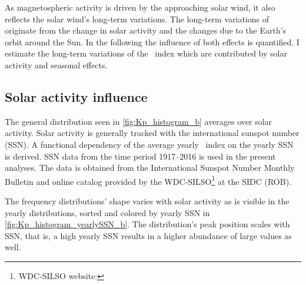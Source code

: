 As magnetospheric activity is driven by the approaching solar wind, it also reflects the solar wind's long-term variations. The long-term variations of \Kp{} originate from the change in solar activity and the changes due to the Earth's orbit around the Sun. In the following the influence of both effects is quantified. I estimate the long-term variations of the \Kp~index which are contributed by solar activity and seasonal effects.

\subsection{Solar activity influence}
The general \Kp{} distribution seen in \autoref{fig:Kp_histogram_b} averages over solar activity. Solar activity is generally tracked with the international sunspot number (SSN). A functional dependency of the average yearly \Kp~index on the yearly SSN is derived. SSN data from the time period 1917--2016 is used in the present analyses. The data is obtained from the International Sunspot Number Monthly Bulletin and online catalog provided by the WDC-SILSO\footnote{WDC-SILSO website: } at the SIDC (ROB).

The \Kp{} frequency distributions' shape varies with solar activity as is visible in the yearly distributions, sorted and colored by yearly SSN in \autoref{fig:Kp_histogram_yearlySSN_b}. The distribution's peak position scales with SSN, that is, a high yearly SSN results in a higher abundance of large \Kp{} values as well.

